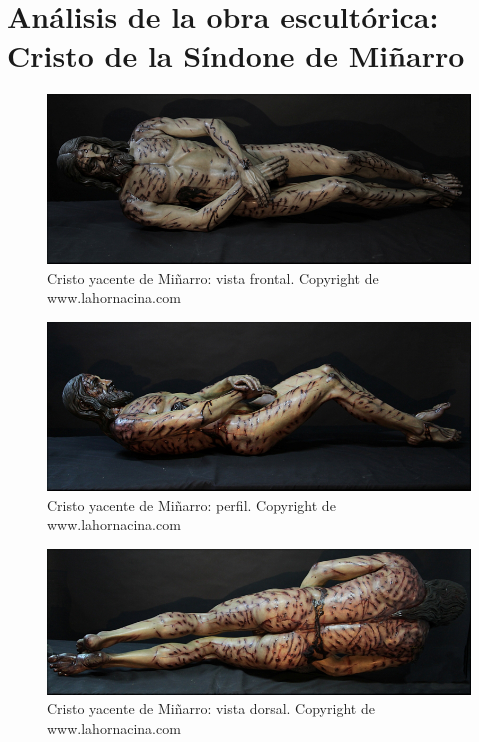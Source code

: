 \section{Análisis de la obra escultórica: Cristo de la Síndone de Miñarro} 

\begin{figure}[ht!]
    \centering
    \includegraphics[width=1.0\textwidth]{minarro1.jpg}
    \caption{Cristo yacente de Miñarro: vista frontal. Copyright de www.lahornacina.com} %
\end{figure}

\begin{figure}[ht!]
    \centering
    \includegraphics[width=1.0\textwidth]{minarro2.jpg}
    \caption{Cristo yacente de Miñarro: perfil. Copyright de www.lahornacina.com} %
\end{figure}

\begin{figure}[ht!]
    \centering
    \includegraphics[width=1.0\textwidth]{minarro3.jpg}
    \caption{Cristo yacente de Miñarro: vista dorsal. Copyright de www.lahornacina.com} %
\end{figure}

